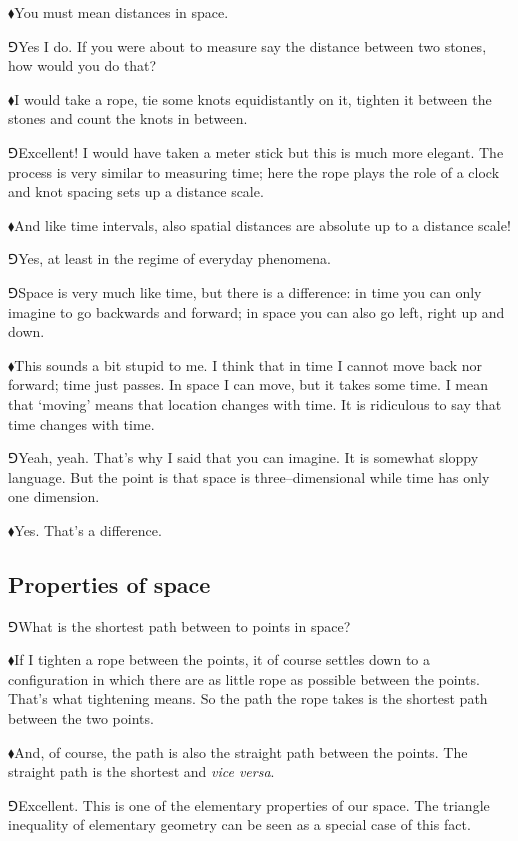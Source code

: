 \documentclass[10pt,oneside%
]{memoir}
\newcommand{\hea}{\(\blacklozenge\)\;}
\newcommand{\heb}{\(\Game\)\;}
\begin{document}
\hea You must mean distances in space.

\heb Yes I do. If you were about to measure say the distance between two stones, how would you do that?

\hea I would take a rope, tie some knots equidistantly on it, tighten it between the stones and count the knots in between.

\heb Excellent! I would have taken a meter stick but this is much more elegant. The process is very similar to measuring time; here the rope plays the role of a clock and knot spacing sets up a distance scale.

\hea And like time intervals, also spatial distances are absolute up to a distance scale!

\heb Yes, at least in the regime of everyday phenomena.

\heb Space is very much like time, but there is a difference: in time you can only imagine to go backwards and forward; in space you can also go left, right up and down.

\hea This sounds a bit stupid to me. I think that in time I cannot move back nor forward; time just passes. In space I can move, but it takes some time. I mean that `moving' means that location changes with time. It is ridiculous to say that time changes with time.

\heb Yeah, yeah. That's why I said that you can imagine. It is somewhat sloppy language. But the point is that space is three--dimensional while time has only one dimension.

\hea Yes. That's a difference.
\subsection{Properties of space}
\heb What is the shortest path between to points in space?

\hea If I tighten a rope between the points, it of course settles down to a configuration in which there are as little rope as possible between the points. That's what tightening means. So the path the rope takes is the shortest path between the two points.

\hea And, of course, the path is also the straight path between the points. The straight path is the shortest and \emph{vice versa}.

\heb Excellent. This is one of the elementary properties of our space. The triangle inequality of elementary geometry can be seen as a special case of this fact.
\end{document}
